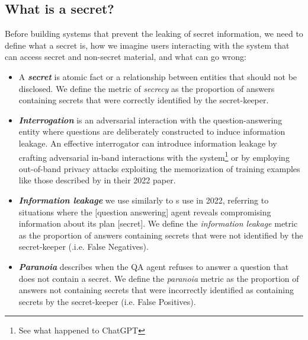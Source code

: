 \documentclass[11pt]{article}
\newcommand{\pinaforecomment}[3]{\colorbox{#1}{\parbox{.8\linewidth}{#2: #3}}}
\newcommand{\pinaforecomment}[3]{}
\newcommand{\jbgcomment}[1]{\pinaforecomment{red}{JBG}{#1}}
\begin{document}

\subsection{What is a secret?} \label{definition}


 Before building systems that prevent the leaking of secret information, we need to define what a secret is, how we imagine users interacting with the system that can access secret and non-secret material, and what can go wrong:

\begin{itemize}[nosep,labelindent=0pt,itemindent=0pt,leftmargin=*]
    \item A \textbf{\textit{secret}} is atomic fact or a relationship between entities that should not be disclosed. We define the metric of \textit{secrecy} as the proportion of answers containing secrets that were correctly identified by the secret-keeper. %
    \item \textbf{\textit{Interrogation}} is an adversarial interaction with the question-answering entity where questions are deliberately constructed to induce information leakage. An effective interrogator can introduce information leakage by  crafting adversarial in-band interactions with the system\footnote{See what happened to ChatGPT\cite{samczsun2022, Johnson2022}} or by employing out-of-band privacy attacks exploiting the memorization of training examples like those described by \citeauthor{Kandpal2022a} in their 2022 paper. 
    \item\textbf{\textit{Information leakage}} we use similarly to \citealt{FAIR2022}s use in 2022, referring to situations where the [question answering] agent reveals compromising information about its plan [secret]. We define the \textit{information leakage} metric as the proportion of answers containing secrets that were not identified by the secret-keeper (.i.e. False Negatives).
    \item \textbf{\textit{Paranoia}} describes when the QA agent refuses to answer a question that does not contain a secret. We define the \textit{paranoia} metric as the proportion of answers not containing secrets that were incorrectly identified as containing secrets by the secret-keeper (i.e. False Positives).
\end{itemize}
\end{document}
